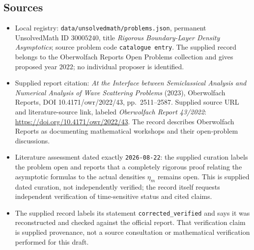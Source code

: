 \documentclass[11pt]{article}
\begin{document}
\subsection{Sources}
\begin{itemize}
\item Local registry: \texttt{data/unsolvedmath/problems.json}, permanent UnsolvedMath ID $30005240$, title \emph{Rigorous Boundary-Layer Density Asymptotics}; source problem code \texttt{catalogue entry}. The supplied record belongs to the Oberwolfach Reports Open Problems collection and gives proposed year $2022$; no individual proposer is identified.
\item Supplied report citation: \emph{At the Interface between Semiclassical Analysis and Numerical Analysis of Wave Scattering Problems} (2023), Oberwolfach Reports, DOI 10.4171/owr/2022/43, pp.\ 2511--2587. Supplied source URL and literature-source link, labeled \emph{Oberwolfach Report 43/2022}: \url{https://doi.org/10.4171/owr/2022/43}. The record describes Oberwolfach Reports as documenting mathematical workshops and their open-problem discussions.
\item Literature assessment dated exactly \texttt{2026-08-22}: the supplied curation labels the problem open and reports that a completely rigorous proof relating the asymptotic formulas to the actual densities $\eta_m$ remains open. This is supplied dated curation, not independently verified; the record itself requests independent verification of time-sensitive status and cited claims.
\item The supplied record labels its statement \texttt{corrected\_verified} and says it was reconstructed and checked against the official report. That verification claim is supplied provenance, not a source consultation or mathematical verification performed for this draft.
\end{itemize}
\end{document}

